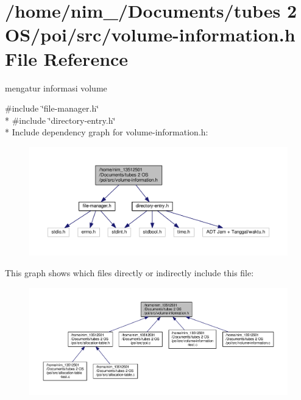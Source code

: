 \hypertarget{volume-information_8h}{\section{/home/nim\-\_/\-Documents/tubes 2 O\-S/poi/src/volume-\/information.h File Reference}
\label{volume-information_8h}
}


mengatur informasi volume  


{\ttfamily \#include \char`\"{}file-\/manager.\-h\char`\"{}}\\*
{\ttfamily \#include \char`\"{}directory-\/entry.\-h\char`\"{}}\\*
Include dependency graph for volume-\/information.h\-:\nopagebreak
\begin{figure}[H]
\begin{center}
\leavevmode
\includegraphics[width=350pt]{volume-information_8h__incl}
\end{center}
\end{figure}
This graph shows which files directly or indirectly include this file\-:
\nopagebreak
\begin{figure}[H]
\begin{center}
\leavevmode
\includegraphics[width=350pt]{volume-information_8h__dep__incl}
\end{center}
\end{figure}
